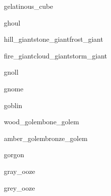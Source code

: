 \documentclass[a4paper,serif]{module}
\begin{document}
\begin{newmonster}{gelatinous_cube}\end{newmonster}

\begin{newmonster}{ghoul}\end{newmonster}


\begin{newmonster3}{hill_giant}{stone_giant}{frost_giant}\end{newmonster3}
\begin{newmonster3*}{fire_giant}{cloud_giant}{storm_giant}{}{}\end{newmonster3*}

\begin{newmonster}{gnoll}\end{newmonster}

\begin{newmonster}{gnome}\end{newmonster}

\begin{newmonster}{goblin}\end{newmonster}


\begin{newmonster2}{wood_golem}{bone_golem}\end{newmonster2}
\begin{newmonster2*}{amber_golem}{bronze_golem}{}{}\end{newmonster2*}

\begin{newmonster}{gorgon}\end{newmonster}

\begin{newmonster}{gray_ooze}\end{newmonster}

\begin{newmonster}{grey_ooze}\end{newmonster}
\end{document}
